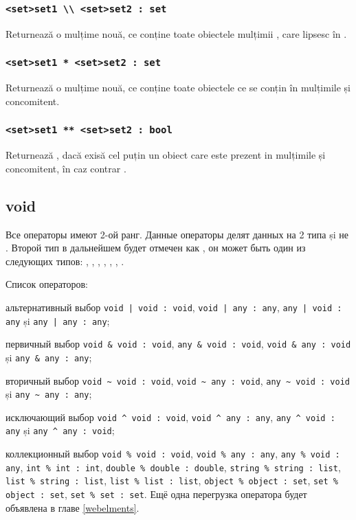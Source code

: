 \subsubsection{\lstinline|<set>set1 \\ <set>set2 : set|}

Returnează o mulțime nouă, ce conține toate obiectele mulțimii , care lipsesc în .

\subsubsection{\lstinline|<set>set1 * <set>set2 : set|}

Returnează o mulțime nouă, ce conține toate obiectele ce se conțin în mulțimile  și  concomitent.

\subsubsection{\lstinline|<set>set1 ** <set>set2 : bool|}

Returnează \true, dacă exisă cel puțin un obiect care este prezent in mulțimile  și  concomitent, în caz contrar \false.

\subsection{\color{lightblue}void}

Все \void{} операторы имеют 2-ой ранг. Данные операторы делят данных на 2 типа \void{} și не \void{}. Второй тип в дальнейшем будет отмечен как , он может быть один из следующих типов: \integer{}, \double{}, \str{}, \listtype{}, \object{}, \set{}, \element{}.

Список \void{} операторов:

\begin{icItems}
\item
	альтернативный выбор \lstinline`void | void : void`, \lstinline`void | any : any`, \lstinline`any | void : any` și \lstinline`any | any : any`;
\item
	первичный выбор \lstinline|void & void : void|, \lstinline|any & void : void|, \lstinline|void & any : void| și \lstinline|any & any : any|;
\item
	вторичный выбор \lstinline|void ~ void : void|, \lstinline|void ~ any : void|, \lstinline|any ~ void : void| și \lstinline|any ~ any : any|;
\item
	исключающий выбор \lstinline|void ^ void : void|, \lstinline|void ^ any : any|, \lstinline|any ^ void : any| și \lstinline|any ^ any : void|;
\item
	коллекционный выбор \lstinline|void % void : void|, \lstinline|void % any : any|, \lstinline|any % void : any|, \lstinline|int % int : int|, \lstinline|double % double : double|, \lstinline|string % string : list|, \lstinline|list % string : list|, \lstinline|list % list : list|, \lstinline|object % object : set|, \lstinline|set % object : set|, \lstinline|set % set : set|. Ещё одна перегрузка оператора будет объявлена в главе \ref{webelments}.
\end{icItems}

